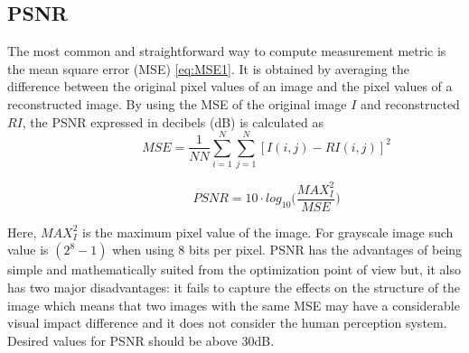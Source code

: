 \FloatBarrier

\subsection{PSNR} 
The most common and straightforward way to compute measurement metric is the mean square error (MSE) \ref{eq:MSE1}. It is obtained by averaging the difference between the original pixel values of an image and the pixel values of a reconstructed image. By using the MSE of the original image $I$ and reconstructed $RI$, the PSNR expressed in decibels (dB) is calculated as
\begin{equation} \label{eq:mse1}
\hspace{3em} \hspace{3em} \hspace{3em} MSE = \frac{1}{NN} \sum\limits_{i=1}^N \sum\limits_{j=1}^N [ I( i , j) - RI ( i , j ) ]^2    \enspace \enspace \hspace{3em}
\end{equation} 

\begin{equation} \label{eq:LS1}
\hspace{3em} \hspace{3em} \hspace{3em} PSNR = 10 \cdot log_{10} \bigg( \frac{ MAX_{I}^{2} }{MSE} \bigg) \enspace \enspace \hspace{3em}
\end{equation} 

Here, $MAX_{I}^{2}$ is the maximum pixel value of the image. For grayscale image such value is $(2^8 - 1)$ when using 8 bits per pixel. PSNR has the advantages of being simple and mathematically suited from the optimization point of view but, it also has two major disadvantages: it fails to capture the effects on the structure of the image which means that two images with the same MSE may have a considerable visual impact difference and it does not consider the human perception system. Desired values for PSNR should be above 30dB. 

\FloatBarrier

